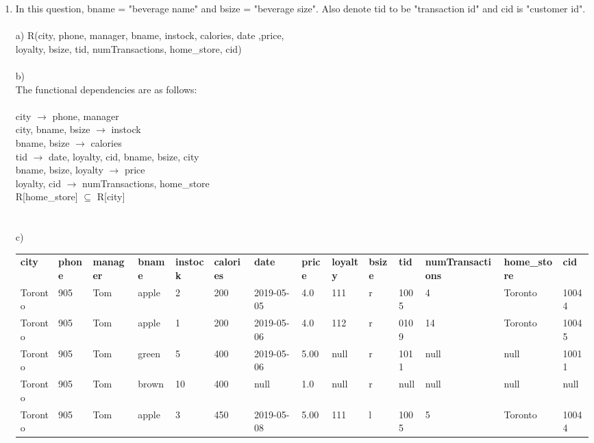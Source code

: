 \documentclass{article}
\begin{document}
\begin{enumerate}
    \item %
    In this question, bname = "beverage name" and bsize = "beverage size". Also denote tid to be "transaction id" and cid is "customer id".\\\\
	a)
	R(city, phone, manager, bname, instock, calories, date ,price,\\
	 loyalty, bsize, tid, numTransactions, home\_store, cid)\\\\
	b)\\The functional dependencies are as follows:\\\\
		city $\rightarrow$ phone, manager\\
		city, bname, bsize $\rightarrow$ instock\\
		bname, bsize $\rightarrow$ calories\\
		tid $\rightarrow$ date, loyalty, cid, bname, bsize, city\\
		bname, bsize, loyalty $\rightarrow$ price\\
		loyalty, cid $\rightarrow$ numTransactions, home\_store\\
		R[home\_store] $\subseteq$ R[city]
	\\\\\\
	c)\begin{table}[h]
		  \centering
		\begin{adjustbox}{width=1.1\textwidth}
		\begin{tabular}{llllllllllllll}
			\textbf{city}&\textbf{phone}&\textbf{manager}&\textbf{bname}&\textbf{instock}&\textbf{calories}&\textbf{date}&\textbf{price}&\textbf{loyalty}&\textbf{bsize}&\textbf{tid}&\textbf{numTransactions}&\textbf{home\_store}&\textbf{cid}\\
			Toronto & 905 & Tom & apple & 2 & 200 & 2019-05-05 & 4.0 & 111 & r  & 1005 &4 & Toronto & 10044\\
			Toronto & 905 & Tom & apple & 1 & 200 & 2019-05-06 & 4.0 & 112 & r  & 0109 &14 & Toronto & 10045 \\	
			Toronto & 905 & Tom & green & 5 & 400 & 2019-05-06 & 5.00 & null & r & 1011 & null & null & 10011 \\
			Toronto & 905 & Tom & brown & 10 & 400 & null       & 1.0  & null & r & null & null & null & null \\
			Toronto & 905 & Tom & apple & 3  & 450 & 2019-05-08 & 5.00 & 111  & l & 1005 & 5    & Toronto & 10044 \\

\end{tabular}
\end{adjustbox}
\end{table}
\end{enumerate}
\end{document}
